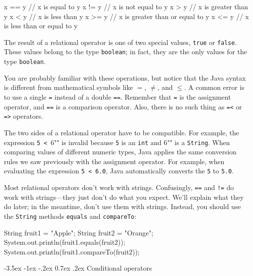 \documentclass[12pt]{book}
\makeatletter
\theoremstyle{exercise}
\newcommand{\java}[1]{\verb"#1"}
\renewcommand{\section}{\@startsection {section}{1}{\z@}%
    {-3.5ex \@plus -1ex \@minus -.2ex}%
    {0.7ex \@plus.2ex}%
    {\normalfont\Large\bfseries}}
\newcommand{\java}[1]{\lstinline{#1}} %
\makeatother
\begin{document}
\begin{code}
    x == y          // x is equal to y
    x != y          // x is not equal to y
    x > y           // x is greater than y
    x < y           // x is less than y
    x >= y          // x is greater than or equal to y
    x <= y          // x is less than or equal to y
\end{code}

The result of a relational operator is one of two special values, \java{true} or \java{false}.
These values belong to the type \java{boolean}; in fact, they are the only values for the type \java{boolean}.

You are probably familiar with these operations, but notice that the Java syntax is different from mathematical symbols like $=$, $\neq$, and $\le$.
A common error is to use a single \java{=} instead of a double \java{==}.
Remember that \java{=} is the assignment operator, and \java{==} is a comparison operator.
Also, there is no such thing as \java{=<} or \java{=>} operators.

The two sides of a relational operator have to be compatible.
For example, the expression \java{5 < "6"} is invalid because \java{5} is an \java{int} and \java{"6"} is a \java{String}.
When comparing values of different numeric types, Java applies the same conversion rules we saw previously with the assignment operator.
For example, when evaluating the expression \java{5 < 6.0}, Java automatically converts the \java{5} to \java{5.0}.

Most relational operators don't work with strings.
Confusingly, \java{==} and \java{!=} do work with strings---they just don't do what you expect.
We'll explain what they do later; in the meantime, don't use them with strings.
Instead, you should use the \java{String} methods \java{equals} and \java{compareTo}:

\begin{code}
    String fruit1 = "Apple";
    String fruit2 = "Orange";
    System.out.println(fruit1.equals(fruit2));
    System.out.println(fruit1.compareTo(fruit2));
\end{code}


\section{Conditional operators}

\end{document}
